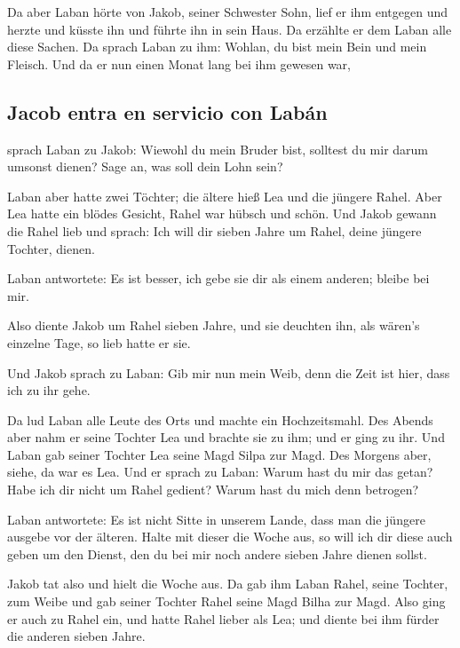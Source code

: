  Da aber Laban hörte von Jakob, seiner Schwester Sohn,
lief er ihm entgegen und herzte und küsste ihn und führte ihn in sein
Haus. Da erzählte er dem Laban alle diese Sachen.  Da
sprach Laban zu ihm: Wohlan, du bist mein Bein und mein Fleisch. Und da
er nun einen Monat lang bei ihm gewesen war,

\hypertarget{jacob-entra-en-servicio-con-labuxe1n}{%
\subsection{Jacob entra en servicio con
Labán}\label{jacob-entra-en-servicio-con-labuxe1n}}

 sprach Laban zu Jakob: Wiewohl du mein Bruder bist,
solltest du mir darum umsonst dienen? Sage an, was soll dein Lohn sein?

 Laban aber hatte zwei Töchter; die ältere hieß Lea und
die jüngere Rahel.  Aber Lea hatte ein blödes Gesicht,
Rahel war hübsch und schön.  Und Jakob gewann die Rahel
lieb und sprach: Ich will dir sieben Jahre um Rahel, deine jüngere
Tochter, dienen.

 Laban antwortete: Es ist besser, ich gebe sie dir als
einem anderen; bleibe bei mir.

 Also diente Jakob um Rahel sieben Jahre, und sie
deuchten ihn, als wären's einzelne Tage, so lieb hatte er sie.

 Und Jakob sprach zu Laban: Gib mir nun mein Weib, denn
die Zeit ist hier, dass ich zu ihr gehe.

 Da lud Laban alle Leute des Orts und machte ein
Hochzeitsmahl.  Des Abends aber nahm er seine Tochter Lea
und brachte sie zu ihm; und er ging zu ihr.  Und Laban
gab seiner Tochter Lea seine Magd Silpa zur Magd.  Des
Morgens aber, siehe, da war es Lea. Und er sprach zu Laban: Warum hast
du mir das getan? Habe ich dir nicht um Rahel gedient? Warum hast du
mich denn betrogen?

 Laban antwortete: Es ist nicht Sitte in unserem Lande,
dass man die jüngere ausgebe vor der älteren.  Halte mit
dieser die Woche aus, so will ich dir diese auch geben um den Dienst,
den du bei mir noch andere sieben Jahre dienen sollst.

 Jakob tat also und hielt die Woche aus. Da gab ihm Laban
Rahel, seine Tochter, zum Weibe  und gab seiner Tochter
Rahel seine Magd Bilha zur Magd.  Also ging er auch zu
Rahel ein, und hatte Rahel lieber als Lea; und diente bei ihm fürder die
anderen sieben Jahre.

